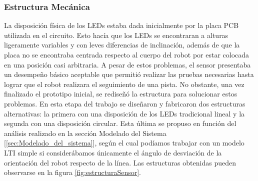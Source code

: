 \documentclass[10pt,conference,a4paper,onecolumn]{article}%
\begin{document}
\subsubsection{Estructura Mecánica}
La disposición física de los LEDs estaba dada inicialmente por la placa PCB utilizada en el circuito. Esto hacía que los LEDs se encontraran a alturas ligeramente variables y con leves diferencias de inclinación, además de que la placa no se encontraba centrada respecto al cuerpo del robot por estar colocada en una posición
casi arbitraria. A pesar de estos problemas, el sensor presentaba un desempeño básico aceptable que permitió realizar las pruebas necesarias hasta lograr que el robot realizara el seguimiento de una pista. No obstante, una vez finalizado el prototipo inicial, se rediseñó la estructura para solucionar estos problemas. En esta etapa
del trabajo se diseñaron y fabricaron dos estructuras alternativas: la primera con una disposición de los LEDs tradicional lineal y la segunda con una disposición circular. Esta última se propuso en función del análisis realizado en la sección Modelado del Sistema [\ref{sec:Modelado_del_sistema}], según el cual podíamos trabajar con un modelo LTI simple
si considerábamos únicamente el ángulo de desviación de la orientación del robot respecto de la línea. Las estructuras obtenidas pueden observarse en la figura \ref{fig:estructuraSensor}. 
\end{document}
